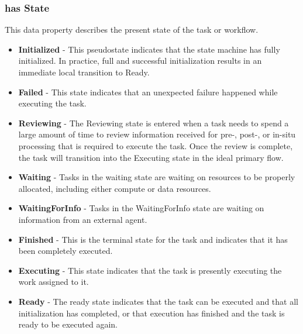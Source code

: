 			\subsubsection{
			has State
			}
			This data property describes the present state of the task or workflow.
			\begin{itemize}
			  \item \textbf{Initialized} - This pseudostate indicates that the state
			  machine has fully initialized. In practice, full and successful
			  initialization results in an immediate local transition to Ready.
			  \item \textbf{Failed} - This state indicates that an unexpected failure
			  happened while executing the task.
			  \item \textbf{Reviewing} - The Reviewing state is entered when a task
			  needs to spend a large amount of time to review information received for
			  pre-, post-, or in-situ processing that is required to execute the task.
			  Once the review is complete, the task will transition into the Executing
			  state in the ideal primary flow.
			  \item \textbf{Waiting} - Tasks in the waiting state are waiting on
			  resources to be properly allocated, including either compute or data
			  resources.
			  \item \textbf{WaitingForInfo} - Tasks in the WaitingForInfo state are
			  waiting on information from an external agent.
			  \item \textbf{Finished} - This is the terminal state for the task and
			  indicates that it has been completely executed.
			  \item \textbf{Executing} - This state indicates that the task is presently
			  executing the work assigned to it.
			  \item \textbf{Ready} - The ready state indicates that the task can be
			  executed and that all initialization has completed, or that execution has
			  finished and the task is ready to be executed again.
			\end{itemize}
